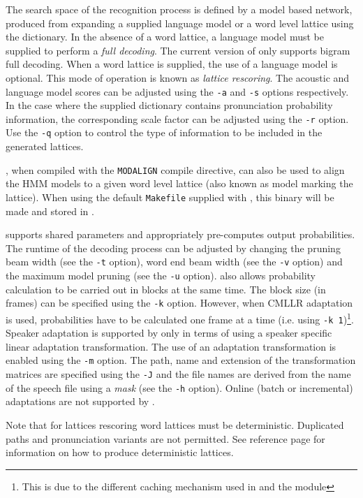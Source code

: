 The search space of the recognition process is defined by a model based 
network, produced from expanding a supplied language model or a word 
level lattice using the dictionary. In the absence of a word lattice,
a language model must be supplied to perform a \emph{full decoding}. 
The current version of  only supports bigram full decoding.
When a word lattice is supplied, the use of a language model is optional. 
This mode of operation is known as \emph{lattice rescoring}.
The acoustic and language model scores can be adjusted using the
\texttt{-a} and \texttt{-s} options respectively. 
In the case where the supplied dictionary
contains pronunciation probability information, the corresponding scale
factor can be adjusted using the \texttt{-r} option. Use the \texttt{-q} option
to control the type of information to be included in the generated lattices.

, when compiled with the \texttt{MODALIGN} compile directive,
can also be used to align the HMM models to a given word level lattice
(also known as model marking the lattice). When using the default
\texttt{Makefile} supplied with , this binary will be
made and stored in .

 supports shared parameters and appropriately pre-computes 
output probabilities. The runtime of the decoding process can be adjusted by
changing the pruning beam width (see the \texttt{-t} option), 
word end beam width (see the \texttt{-v} option) and the maximum model 
pruning (see the \texttt{-u} option).
 also allows probability calculation to be carried out in
blocks at the same time. The block size (in frames) can be specified using
the \texttt{-k} option. However, when CMLLR adaptation is used, probabilities
have to be calculated one frame at a time (i.e. using \texttt{-k 1})\footnote{
This is due to the different caching mechanism used in  and 
the  module}.
Speaker adaptation is supported by  only in terms of
using a speaker specific linear adaptation transformation. The use of
an adaptation transformation is enabled using the \texttt{-m} option.
The path, name and extension of the transformation matrices are specified
using the \texttt{-J} and the file names are derived from the name of the
speech file using a \emph{mask} (see the \texttt{-h} option).
Online (batch or incremental) adaptations are not supported by .

Note that for lattices rescoring word lattices must be deterministic.
Duplicated paths and pronunciation variants are not permitted.  See
 reference page for information on how to produce
deterministic lattices.


